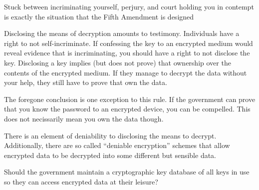 \documentclass[format=sigconf]{acmart}
\begin{document}
Stuck between incriminating yourself, perjury, and court holding you in contempt is exactly the situation that the Fifth Amendment is designed 


Disclosing the means of decryption amounts to testimony. 
  Individuals have a right to not self-incriminate.
  If confessing the key to an encrypted medium would reveal evidence that is incriminating, you should have a right to not disclose the key.
  Disclosing a key implies (but does not prove) that ownership over the contents of the encrypted medium. If they manage to decrypt the data without your help, they still have to prove that own the data.

The foregone conclusion is one exception to this rule.
  If the government can prove that you know the password to an encrypted device, you can be compelled. This does not necissarily mean you own the data though.
  
There is an element of deniability to disclosing the means to decrypt. Additionally, there are so called ``deniable encryption'' schemes that allow encrypted data to be decrypted into some different but sensible data. 

Should the government maintain a cryptographic key database of all keys in use so they can access encrypted data at their leisure?

\medskip



\end{document}
